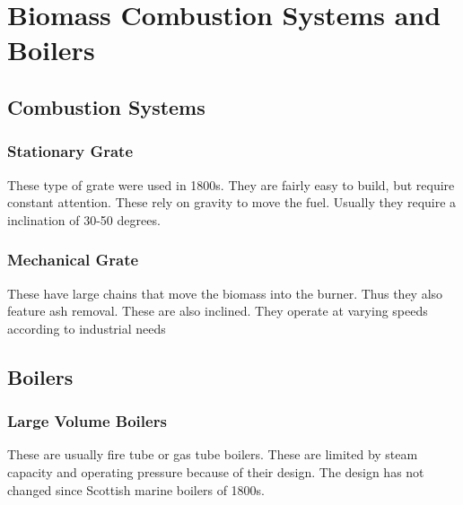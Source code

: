 \documentclass[12pt,a4paper]{article}
\renewcommand{\baselinestretch}{1.5}
\begin{document}
\renewcommand{\baselinestretch}{1}\normalsize
\tableofcontents
\renewcommand{\baselinestretch}{1.5}\normalsize

\listoffigures
 
\listoftables

\listofappendices

\newpage

\setcounter{page}{1}
\section{Biomass Combustion Systems and Boilers}

\subsection{Combustion Systems}

\subsubsection{Stationary Grate}
These type of grate were used in 1800s. They are fairly easy to build, but require constant attention. These rely on gravity to move the fuel. Usually they require a inclination of 30-50 degrees.  \cite[p.~205]{steam-generation}


\subsubsection{Mechanical Grate}

These have large chains that move the biomass into the burner. Thus they also feature ash removal. These are also inclined. They operate at varying speeds according to industrial needs
\cite[p.~206]{steam-generation}

\subsection{Boilers}

\subsubsection{Large Volume Boilers}
These are usually fire tube or gas tube boilers. These are limited by steam capacity and operating pressure because of their design. The design has not changed since Scottish marine boilers of 1800s.
\end{document}
